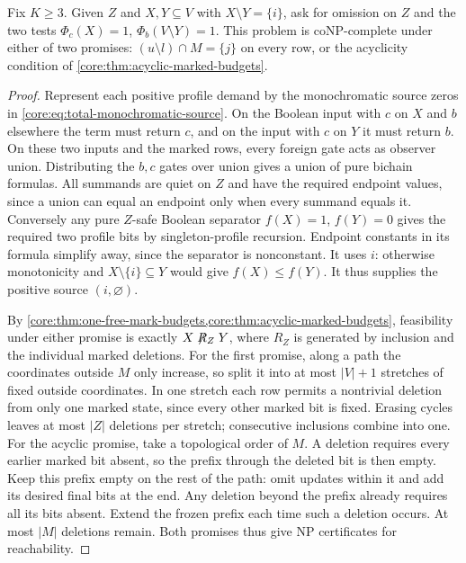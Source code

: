 \begin{theorem}
\label{core:thm:two-repeater-hardness}
Fix $K\ge3$. Given $Z$ and $X,Y\subseteq V$ with
$X\setminus Y=\{i\}$, ask for omission on $Z$ and the two tests
$\Phi_c(X)=1$, $\Phi_b(V\setminus Y)=1$. This problem is coNP-complete
under either of two promises: $(u\setminus l)\cap M=\{j\}$ on every
row, or the acyclicity condition of \cref{core:thm:acyclic-marked-budgets}.
\end{theorem}
\begin{proof}
Represent each positive profile demand by the monochromatic source
zeros in \eqref{core:eq:total-monochromatic-source}. On the Boolean
input with $c$ on $X$ and $b$ elsewhere the term must return $c$,
and on the input with $c$ on $Y$ it must return $b$. On these two
inputs and the marked rows, every foreign gate acts as observer union.
Distributing the $b,c$ gates over union gives a union of pure bichain
formulas. All summands are quiet on $Z$ and have the required endpoint
values, since a union can equal an endpoint only when every summand
equals it. Conversely any pure $Z$-safe Boolean separator $f(X)=1$,
$f(Y)=0$ gives the required two profile bits by singleton-profile
recursion. Endpoint constants in its formula simplify away, since
the separator is nonconstant. It uses $i$: otherwise monotonicity and
$X\setminus\{i\}\subseteq Y$ would give $f(X)\le f(Y)$. It thus
supplies the positive source $(i,\varnothing)$.

By \cref{core:thm:one-free-mark-budgets,core:thm:acyclic-marked-budgets},
feasibility under either promise is exactly $X\not\mathrel{R_Z}Y$,
where $R_Z$ is generated by inclusion and the individual marked
deletions. For the first promise, along a path
the coordinates outside $M$ only increase, so split it into at most
$|V|+1$ stretches of fixed outside coordinates. In one stretch each
row permits a nontrivial deletion from only one marked state, since
every other marked bit is fixed. Erasing cycles leaves at most $|Z|$
deletions per stretch; consecutive inclusions combine into one.
For the acyclic promise, take a topological order of $M$. A deletion
requires every earlier marked bit absent, so the prefix through the
deleted bit is then empty. Keep this prefix empty on the rest of the
path: omit updates within it and add its desired final bits at the
end. Any deletion beyond the prefix already requires all its bits
absent. Extend the frozen prefix each time such a deletion occurs.
At most $|M|$ deletions remain. Both promises thus give NP certificates
for reachability.


\end{proof}
